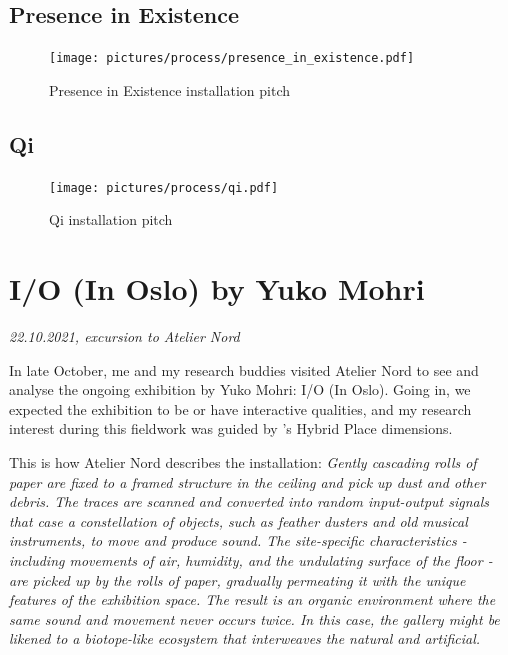 \subsection{Presence in Existence}
\begin{figure}[H]
\texttt{[image: pictures/process/presence\_in\_existence.pdf]}
\caption{Presence in Existence installation pitch}
\centering 
\end{figure}

\subsection{Qi}
\begin{figure}[H]
\texttt{[image: pictures/process/qi.pdf]}
\caption{Qi installation pitch}
\centering 
\end{figure}


\break
\section{I/O (In Oslo) by Yuko Mohri}
\par
\emph{22.10.2021, excursion to Atelier Nord}
\par

In late October, me and my research buddies visited Atelier Nord to see and analyse the ongoing exhibition by Yuko Mohri: I/O (In Oslo). Going in, we expected the exhibition to be or have interactive qualities, and my research interest during this fieldwork was guided by \autocite{hybridplace_ciolfi}'s Hybrid Place dimensions. 

This is how Atelier Nord describes the installation: 
\emph{Gently cascading rolls of paper are fixed to a framed structure in the ceiling and pick up dust and other debris. The traces are scanned and converted into random input-output signals that case a constellation of objects, such as feather dusters and old musical instruments, to move and produce sound. The site-specific characteristics - including movements of air, humidity, and the undulating surface of the floor - are picked up by the rolls of paper, gradually permeating it with the unique features of the exhibition space. The result is an organic environment where the same sound and movement never occurs twice. In this case, the gallery might be likened to a biotope-like ecosystem that interweaves the natural and artificial.} \autocite{yukomohri_web}

